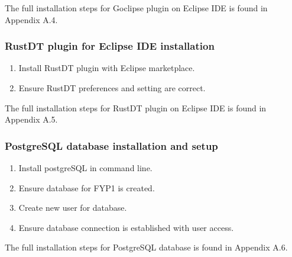 The full installation steps for Goclipse plugin on Eclipse IDE is found in Appendix A.4.

\subsubsection{RustDT plugin for Eclipse IDE installation}

\begin{enumerate}[topsep=0pt,itemsep=-1ex,partopsep=1ex,parsep=1.5ex]
	\item Install RustDT plugin with Eclipse marketplace.
	\item Ensure RustDT preferences and setting are correct. 
\end{enumerate}

The full installation steps for RustDT plugin on Eclipse IDE is found in Appendix A.5.

\subsubsection{PostgreSQL database installation and setup}

\begin{enumerate}[topsep=0pt,itemsep=-1ex,partopsep=1ex,parsep=1.5ex]
	\item Install postgreSQL in command line. 
	\item Ensure database for FYP1 is created. 
	\item Create new user for database.
	\item Ensure database connection is established with user access.
\end{enumerate}

The full installation steps for PostgreSQL database is found in Appendix A.6.


